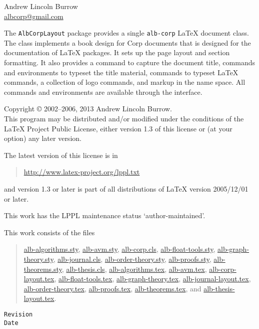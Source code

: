 \documentclass[11pt,a4paper,oneside,titlepage]{alb-corp}
\begin{document}



\begin{albTitlePage}


  Andrew Lincoln Burrow\\
  \url{albcorp@gmail.com}



  The \texttt{AlbCorpLayout} package provides a single \texttt{alb-corp}
  \LaTeX{} document class.  The class implements a book design for
  \albLogo{}Corp documents that is designed for the documentation of
  \LaTeX{} packages.  It sets up the page layout and section formatting.
  It also provides a command to capture the document title, commands and
  environments to typeset the title material, commands to typeset
  \LaTeX{} commands, a collection of logo commands, and markup in the
  \albLogo{} name space.  All commands and environments are available
  through the \AUCTeX{} interface.



  Copyright \copyright{} 2002--2006, 2013 Andrew Lincoln Burrow.\\
  This program may be distributed and/or modified under the conditions
  of the \LaTeX{} Project Public License, either version 1.3 of this
  license or (at your option) any later version.

  \medskip{}

  The latest version of this license is in
  \begin{quote}
    \url{http://www.latex-project.org/lppl.txt}
  \end{quote}
  and version 1.3 or later is part of all distributions of LaTeX version
  2005/12/01 or later.

  \medskip{}

  This work has the LPPL maintenance status `author-maintained'.

  \medskip{}

  This work consists of the files
  \begin{quote}
    \begin{flushleft}
      \url{alb-algorithms.sty}, \url{alb-avm.sty}, \url{alb-corp.cls},
      \url{alb-float-tools.sty}, \url{alb-graph-theory.sty},
      \url{alb-journal.cls}, \url{alb-order-theory.sty},
      \url{alb-proofs.sty}, \url{alb-theorems.sty},
      \url{alb-thesis.cls}, \url{alb-algorithms.tex}, \url{alb-avm.tex},
      \url{alb-corp-layout.tex}, \url{alb-float-tools.tex},
      \url{alb-graph-theory.tex}, \url{alb-journal-layout.tex},
      \url{alb-order-theory.tex}, \url{alb-proofs.tex},
      \url{alb-theorems.tex}, and \url{alb-thesis-layout.tex}.
    \end{flushleft}
  \end{quote}



  \verb$Revision$\\
  \verb$Date$

\end{albTitlePage}
\end{document}
